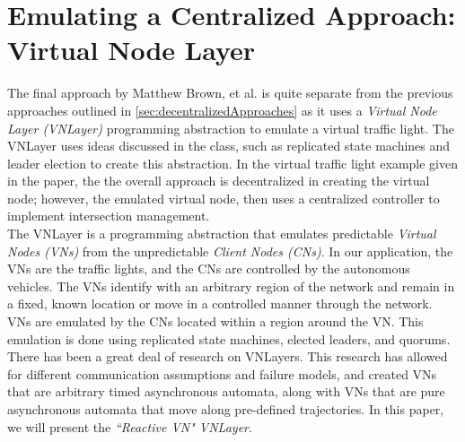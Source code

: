 \documentclass[12pt]{article}
\begin{document}
\section{Emulating a Centralized Approach: Virtual Node Layer}
\label{sec:VNLayer}
The final approach by Matthew Brown, et al. \cite{vnlayer} is quite separate from the previous approaches outlined in \ref{sec:decentralizedApproaches} as it uses a {\em Virtual Node Layer (VNLayer)} programming abstraction to emulate a virtual traffic light.  The VNLayer uses ideas discussed in the class, such as replicated state machines and leader election to create this abstraction. In the virtual traffic light example given in the paper, the the overall approach is decentralized in creating the virtual node; however, the emulated virtual node, then uses a centralized controller to implement intersection management.  
\\
The VNLayer is a programming abstraction that emulates predictable {\em Virtual Nodes (VNs)} from the unpredictable {\em Client Nodes (CNs)}. In our application, the VNs are the traffic lights, and the CNs are controlled by the autonomous vehicles.  The VNs identify with an arbitrary region of the network and remain in a fixed, known location  or move in a controlled manner through the network.  VNs are emulated by the CNs located within a region around the VN.  This emulation is done using replicated state machines, elected leaders, and quorums.  
There has been a great deal of research on VNLayers\cite{vn1}\cite{vn2}\cite{vn3}\cite{vn4}.   
This research has allowed for different communication assumptions and failure models, and created VNs that are arbitrary timed asynchronous automata, along with VNs that are pure asynchronous automata that move along pre-defined trajectories. In this paper, we will present the {\em ``Reactive VN" VNLayer}.\cite{vnlayer}
\end{document}
